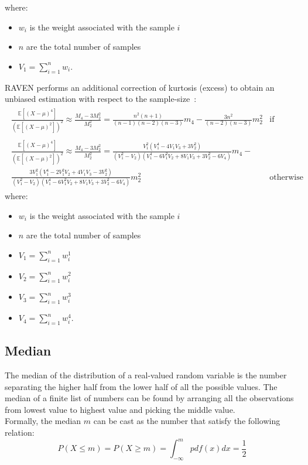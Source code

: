 where:
\begin{itemize}
  \item $w_{i}$ is the weight associated with the sample $i$
  \item $n$ are the total number of samples
  \item $V_{1} = \sum_{i=1}^{n} w_{i}$.
\end{itemize}
RAVEN performs an additional correction of kurtosis (excess) to obtain an unbiased estimation  with respect to the sample-size~\cite{RimoldiniUnbiased}:
\begin{equation}
\begin{split}
\begin{matrix}
\frac{ \mathbb{E}\left [ \left ( X-\mu \right )^{4} \right ]}{\left ( \mathbb{E}\left [ \left ( X-\mu \right )^{2} \right ] \right )^{2}}   \approx \frac{M_{4}-3M_{2}^{2}}{M_{2}^{2}}  = \displaystyle \frac{n^{2}(n+1)}{(n-1)(n-2)(n-3)}m_{4}-\frac{3n^{2}}{(n-2)(n-3)}m_{2}^{2} & \text{if random sampling}
\\
\\
\frac{ \mathbb{E}\left [ \left ( X-\mu \right )^{4} \right ]}{\left ( \mathbb{E}\left [ \left ( X-\mu \right )^{2} \right ] \right )^{2}}    \approx \frac{M_{4}-3M_{2}^{2}}{M_{2}^{2}}  = \displaystyle  \frac{V_{1}^{2}(V_{1}^{4}-4V_{1}V_{3}+3V_{2}^{2})}{(V_{1}^{2}-V_{2})(V_{1}^{4}-6V_{1}^{2}V_{2}+8V_{1}V_{3}+3V_{2}^{2}-6V_{4})}m_{4}
- \\
\displaystyle \frac{3V_{1}^{2}(V_{1}^{4}-2V_{1}^{2}V_{2}+4V_{1}V_{3}-3V_{2}^{2})}{(V_{1}^{2}-V_{2})(V_{1}^{4}-6V_{1}^{2}V_{2}+8V_{1}V_{3}+3V_{2}^{2}-6V_{4})}m_{2}^{2} & \text{otherwise}
\end{matrix}
\end{split}
\end{equation}
where:
\begin{itemize}
  \item $w_{i}$ is the weight associated with the sample $i$
  \item $n$ are the total number of samples
  \item $V_{1} = \sum_{i=1}^{n} w_{i}^{1}$
  \item $V_{2} = \sum_{i=1}^{n} w_{i}^{2}$
  \item $V_{3} = \sum_{i=1}^{n} w_{i}^{3}$
  \item $V_{4} = \sum_{i=1}^{n} w_{i}^{4}$.
\end{itemize}

\subsection{Median}
The median of the distribution of a real-valued random variable is the number separating the higher half from the lower half of all
the possible values. The median of a finite list of numbers can be found by arranging all the observations from lowest value to highest value and picking the middle value.
\\Formally, the median $m$ can be cast as the number that satisfy the following relation:
\begin{equation}
  P(X\leq m) = P(X \geq m) = \int_{-\infty}^{m} pdf(x) dx=\frac{1}{2}
\end{equation}

